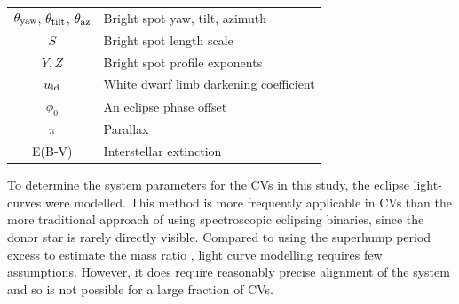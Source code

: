 \begin{table}
\begin{tabular}{cl}
        $\theta_{\rm yaw}$, $\theta_{\rm tilt}$, $\theta_{\rm az}$      & Bright spot yaw, tilt, azimuth                          \\
        $S$                                                             & Bright spot length scale                                \\
        $Y, Z$                                                          & Bright spot profile exponents                           \\
        $u_{\rm ld}$                                                    & White dwarf limb darkening coefficient                  \\
        $\phi_0$                                                        & An eclipse phase offset                                 \\
        $\pi$                                                           & Parallax                                                \\
        E(B-V)                                                          & Interstellar extinction   \\

        \hline
    \end{tabular}
\end{table}

To determine the system parameters for the CVs in this study, the eclipse light-curves were modelled. This method is more frequently applicable in CVs than the more traditional approach of using spectroscopic eclipsing binaries, since the donor star is rarely directly visible. Compared to using the superhump period excess to estimate the mass ratio \citep{patterson2005, knigge2006}, light curve modelling requires few assumptions. However, it does require reasonably precise alignment of the system and so is not possible for a large fraction of CVs.

